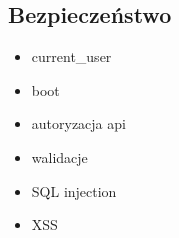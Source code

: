   \subsection{Bezpieczeństwo}
    \begin{itemize}
      \item current\_user
      \item boot
      \item autoryzacja api
      \item walidacje
      \item SQL injection
      \item XSS
    \end{itemize}

